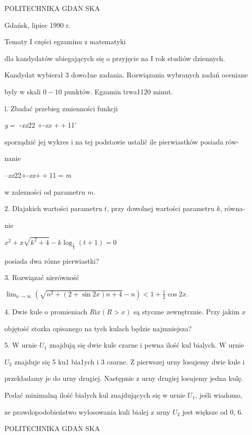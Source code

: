 \documentclass[a4paper,12pt]{article}
\begin{document}
POLITECHNIKA $\mathrm{G}\mathrm{D}\mathrm{A}\acute{\mathrm{N}}$ SKA

Gdańsk, lipiec 1990 r.

Tematy I części egzaminu z matematyki

dla kandydatów ubiegających się o przyjęcie na I rok studiów dziennych.

Kandydat wybierał 3 dowo1ne zadania. Rozwiązania wybranych zadań oceniane

byly w skali $0-10$ punktów. Egzamin trwa1120 minut.

l. Zbadać przebieg zmienności funkcji

{\it y}$=$ -{\it xx}22 $+$-{\it xx} $++$11'

sporządzić jej wykres i na tej podstawie ustalič ile pierwiastków posiada rów-

nanie

--{\it xx}22$+$-{\it xx}$++$11$=${\it m}

w zalezności od parametru $m.$

2. Dlajakich wartości parametru $t$, przy dowolnej wartości parametru $k$, równa-

nie

$x^{2}+x\sqrt{k^{2}+4}-k\log_{\frac{1}{2}}(t+1)=0$

posiada dwa rózne pierwiastki?

3. Rozwiązać nierówność

$\displaystyle \lim_{n\rightarrow\infty}(\sqrt{n^{2}+(2+\sin 2x)n+4}-n)<1+\frac{1}{2}\cos 2x.$

4. Dwie kule o promieniach $R\mathrm{i}x(R>x)$ są styczne zewnętrznie. Przy jakim $x$

objętość stozka opisanego na tych kulach będzie najmniejsza?

5. $\mathrm{W}$ urnie $U_{1}$ znajdują się dwie kule czarne i pewna ilość kul bialych. $\mathrm{W}$ urnie

$U_{2}$ znajduje się 5 ku1 bia1ych i 3 czarne. $\mathrm{Z}$ pierwszej urny losujemy dwie kule i

przekładamy je do urny drugiej. Następnie z urny drugiej losujemy jedna kulę.

Podać minimalną ilość bialych kul znajdujących się w urnie $U_{1}$, jeśli wiadomo,

$\dot{\mathrm{z}}\mathrm{e}$ prawdopodobieństwo wylosowania kuli bialej z urny $U_{2}$ jest większe od 0, 6.




POLITECHNIKA $\mathrm{G}\mathrm{D}\mathrm{A}\acute{\mathrm{N}}$ SKA
\end{document}
